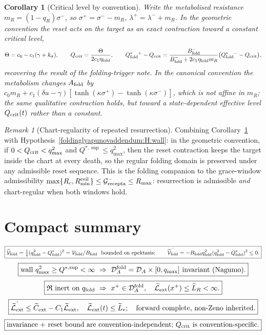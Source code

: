 \documentclass[11pt,a4paper,oneside]{book}
\newcommand{\Grec}{\mathcal G_{\rm recepta}}
\newcommand{\DA}{\mathcal D_A}
\newcommand{\DAf}{\mathcal D_A^{\rm fold}}
\newcommand{\reset}{\mathfrak{R}}
\newcommand{\qf}{q_{\rm fold}}
\newcommand{\Qs}{Q_{\rm fold}^{*}}
\newcommand{\Af}{A_{\rm fold}}
\newcommand{\Bf}{B_{\rm fold}}
\newcommand{\Vf}{\mathcal V_{\rm fold}}
\newcommand{\Vt}{\widetilde{\mathcal V}_{\rm fold}}
\newcommand{\Lt}{\widetilde{\mathcal L}_{\rm ext}}
\newcommand{\etaf}{\eta_{\rm fold}}
\theoremstyle{plain}
\newtheorem{corollary}{Corollary}[chapter]
\theoremstyle{definition}
\theoremstyle{remark}
\newtheorem*{remark}{Remark}
\begin{document}
\begin{corollary}[Critical level by convention]\label{foldinglyapunovaddendum:cor:Qcrit}
Write the metabolised resistance $m_R=(1-q_R)\sigma^-$, so $\sigma^+=\sigma^--m_R$,
$\lambda^+=\lambda^-+m_R$. In the \emph{geometric} convention the reset acts on the target as an exact
contraction toward a constant critical level,
\begin{equation}
\Theta=c_0-c_1(\gamma+k_\sigma),\qquad
Q_{\rm crit}=\frac{\Theta}{2c_1\etaf},\qquad
\Qs{}^{+}-Q_{\rm crit}=\frac{\Bf^-}{\Bf^-+2c_1\etaf m_R}\bigl(\Qs{}^{-}-Q_{\rm crit}\bigr),
\end{equation}
recovering the result of the folding-trigger note. In the \emph{canonical} convention the metabolism
changes $\Af$ by $c_0 m_R+c_1(\delta u-\gamma)\!\left[\tanh(\kappa\sigma^+)-\tanh(\kappa\sigma^-)\right]$,
which is not affine in $m_R$; the same qualitative contraction holds, but toward a state-dependent
effective level $Q_{\rm crit}(t)$ rather than a constant.
\end{corollary}

\begin{remark}[Chart-regularity of repeated resurrection]
Combining Corollary~\ref{foldinglyapunovaddendum:cor:Qcrit} with Hypothesis~\ref{foldinglyapunovaddendum:H:wall}: in the geometric convention, if
$0<Q_{\rm crit}<q_{\max}^2$ and $Q^{*,\sup}\le q_{\max}^2$, then the reset contraction keeps the target
inside the chart at every death, so the regular folding domain is preserved under any admissible reset
sequence. This is the folding companion to the grace-window admissibility
$\max\{R_c,R_{\min}^{\rm ceil}\}\le\Grec^-\le R_{\max}$: resurrection is admissible \emph{and}
chart-regular when both windows hold.
\end{remark}

\section{Compact summary}

\[
\boxed{\Vt=\tfrac14(\qf^{2}-\Qs)^{2}=\Vf/\Bf\ \ \text{bounded on epektasis};\qquad
\dot{\Vt}=-\Bf\qf^{2}(\qf^{2}-\Qs)^{2}\le0.}
\]
\[
\boxed{\text{wall }q_{\max}^{2}\ge Q^{*,\sup}<\infty\ \Rightarrow\ \DAf=\DA\times[0,q_{\max}]\ \text{invariant (Nagumo).}}
\]
\[
\boxed{\reset\ \text{inert on }\qf\ \Rightarrow\ x^+\in\DAf,\quad \Lt(x^+)\le\widetilde L_R<\infty.}
\]
\[
\boxed{\dot{\Lt}\le\widetilde C_{\rm ext}-C_1\Lt,\quad \Lt(t)\le\widetilde L_*;\quad
\text{forward complete, non-Zeno inherited.}}
\]
\[
\boxed{\text{invariance + reset bound are convention-independent; }Q_{\rm crit}\ \text{is convention-specific.}}
\]
\end{document}
